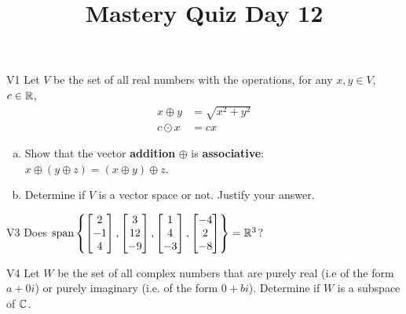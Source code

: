 \documentclass{sbgLAquiz}
\title{Mastery Quiz Day 12 }
\begin{document}
\begin{problem}{V1}
Let $V$ be the set of all real numbers with the operations, for any $x, y \in V$, $c \in \mathbb{R}$,
\begin{align*}
x \oplus y &= \sqrt{x^2+y^2} \\
c \odot x &= c x
\end{align*}
\begin{enumerate}[(a)]
\item Show that the vector \textbf{addition} $\oplus$ is \textbf{associative}:
      \(x \oplus (y \oplus z)=(x\oplus y)\oplus z\).
\item Determine if $V$ is a vector space or not.  Justify your answer.
\end{enumerate}
\end{problem}

\begin{problem}{V3}
Does
\(
  \operatorname{span}\left\{
    \begin{bmatrix} 2 \\ -1 \\ 4 \end{bmatrix},
    \begin{bmatrix} 3 \\ 12 \\ -9 \end{bmatrix},
    \begin{bmatrix} 1 \\ 4 \\ -3 \end{bmatrix},
    \begin{bmatrix} -4 \\ 2 \\ -8 \end{bmatrix}
  \right\} = \mathbb{R}^3
\)?
\end{problem}
\newpage

\begin{problem}{V4} Let \(W\) be the set of all complex numbers
that are purely real (i.e of the form $a+0i$)  or purely imaginary (i.e. of the form $0+bi$).
Determine if \(W\) is a subspace of \(\mathbb{C}\).
\end{problem}
\end{document}
